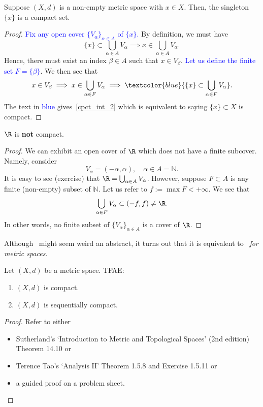 \begin{eg}
Suppose $(X,d)$ is a non-empty metric space with $x\in X$. Then, the singleton $\{x\}$ is a compact set.
\begin{proof}
	\textcolor{blue}{Fix any open cover $\{V_\alpha\}_{\alpha \in A}$ of $\{x\}$.} By definition, we must have
	\[
	\{x\}\subset \bigcup_{\alpha \in A}V_\alpha \implies x\in \bigcup_{\alpha \in A}V_\alpha.
	\]
	Hence, there must exist an index $\beta\in A$ such that $x \in V_\beta$. \textcolor{blue}{Let us define the finite set $F = \{\beta\}$}. We then see that
	\[
	x \in V_\beta \implies x \in \bigcup_{\alpha \in F}V_\alpha \implies \textcolor{blue}{\{x\}\subset \bigcup_{\alpha \in F}V_\alpha}.
	\]
	The text in \textcolor{blue}{blue} gives~\ref{cpct_int_2} which is equivalent to saying $\{x\}\subset X$ is compact.
\end{proof}
\end{eg}
\begin{eg}
$\R$ is \textbf{not} compact.
\begin{proof}
We can exhibit an open cover of $\R$ which does not have a finite subcover. Namely, consider
\[
V_\alpha = (-\alpha,\alpha),\quad \alpha \in A = \mathbb{N}.
\]
It is easy to see (exercise) that $\R = \bigcup_{\alpha \in A}V_\alpha$. However, suppose $F\subset A$ is any finite (non-empty) subset of $\mathbb{N}$. Let us refer to $f := \max F < +\infty$. We see that
\[
\bigcup_{\alpha \in F}V_\alpha \subset (-f,f) \neq \R.
\]
In other words, no finite subset of $\{V_\alpha\}_{\alpha \in A}$ is a cover of $\R$.
\end{proof}
\end{eg}
Although~ might seem weird an abstract, it turns out that it is equivalent to~ \textit{for metric spaces.}
\begin{thm}
\label{thm:cpct_equiv}
Let $(X,d)$ be a metric space. TFAE:
\begin{enumerate}
	\item \label{cpct_equiv_1} $(X,d)$ is compact.
	\item \label{cpct_equiv_2} $(X,d)$ is sequentially compact.
\end{enumerate}
\end{thm}
\begin{proof}[Proof]
Refer to either 
\begin{itemize}
	\item Sutherland's `Introduction to Metric and Topological Spaces' (2nd edition) Theorem 14.10 or
	\item Terence Tao's `Analysis II' Theorem 1.5.8 and Exercise 1.5.11 or
	\item a guided proof on a problem sheet.
\end{itemize}
\end{proof}